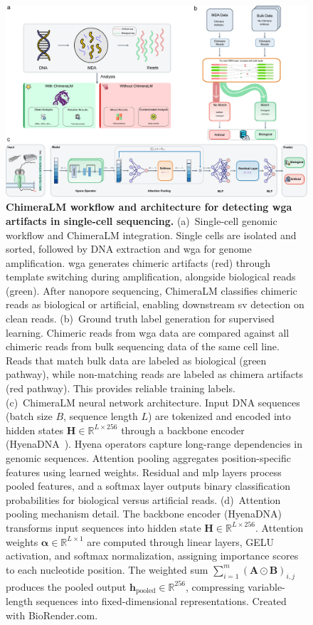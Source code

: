 \documentclass[pdflatex,sn-nature,lineno]{sn-jnl}%
\theoremstyle{thmstyleone}%
\theoremstyle{thmstyletwo}%
\theoremstyle{thmstylethree}%
\begin{document}
\begin{figure}[p]
	\begin{center}
		\includegraphics[width=\textwidth]{final_figures/figure1}
	\end{center}
	\caption{{\bf ChimeraLM workflow and architecture for detecting \gls{wga} artifacts in single-cell sequencing.}
		(a)~Single-cell genomic workflow and ChimeraLM integration. Single cells are isolated and sorted, followed by DNA extraction and \gls{wga} for genome amplification. \gls{wga} generates chimeric artifacts (red) through template switching during amplification, alongside biological reads (green). After nanopore sequencing, ChimeraLM classifies chimeric reads as biological or artificial, enabling downstream \gls{sv} detection on clean reads.
		(b)~Ground truth label generation for supervised learning. Chimeric reads from \gls{wga} data are compared against all chimeric reads from bulk sequencing data of the same cell line. Reads that match bulk data are labeled as biological (green pathway), while non-matching reads are labeled as chimera artifacts (red pathway). This provides reliable training labels.
		(c)~ChimeraLM neural network architecture. Input DNA sequences (batch size $B$, sequence length $L$) are tokenized and encoded into hidden states $\mathbf{H} \in \mathbb{R}^{L \times 256}$ through a backbone encoder (HyenaDNA~\cite{nguyen2023hyenadna}). Hyena operators capture long-range dependencies in genomic sequences. Attention pooling aggregates position-specific features using learned weights. Residual and \gls{mlp} layers process pooled features, and a softmax layer outputs binary classification probabilities for biological versus artificial reads.
		(d)~Attention pooling mechanism detail. The backbone encoder (HyenaDNA) transforms input sequences into hidden state $\mathbf{H} \in \mathbb{R}^{L \times 256}$. Attention weights $\boldsymbol{\alpha} \in \mathbb{R}^{L \times 1}$ are computed through linear layers, GELU activation, and softmax normalization, assigning importance scores to each nucleotide position. The weighted sum $\sum_{i=1}^{m} (\mathbf{A} \odot \mathbf{B})_{i,j}$ produces the pooled output $\mathbf{h}_{\text{pooled}} \in \mathbb{R}^{256}$, compressing variable-length sequences into fixed-dimensional representations.
		Created with BioRender.com.} 
	\label{fig:figure1}
\end{figure}
\end{document}
